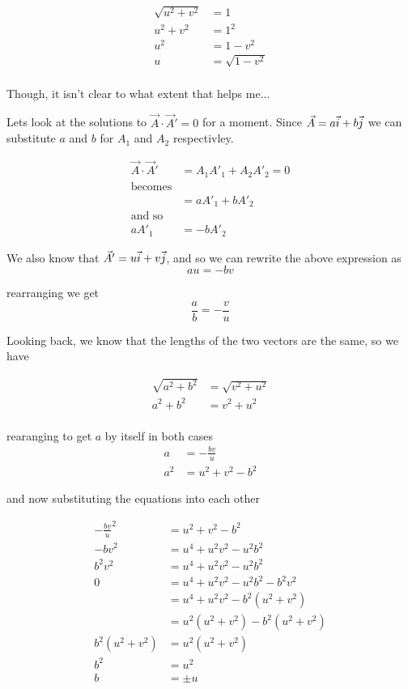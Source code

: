 \documentclass[main.tex]{subfiles}
\begin{document}
\begin{align*}
\sqrt{u^2 + v^2} &= 1\\
u^2 + v^2 &= 1^2\\
u^2 &= 1 - v^2\\
u &= \sqrt{1 - v^2}\\
\end{align*}

Though, it isn't clear to what extent that helps me...

Lets look at the solutions to $\vec{A} \cdot \vec{A}' = 0$ for a
moment. Since $\vec{A} = a\vec{i} + b\vec{j}$ we can substitute $a$ and $b$
for $A_1$ and $A_2$ respectivley.

\begin{align*}
\vec{A} \cdot \vec{A}' &= {A_1}{A'}_1 + {A_2}{A'}_2 = 0\\
\text{becomes}\\
&= a{A'}_1 + b{A'}_2\\
\text{and so}\\
a{A'}_1 &= - b{A'}_2
\end{align*}

We also know that $\vec{A}' = u\vec{i} + v\vec{j}$, and so we can rewrite
the above expression as
\begin{equation*}
au = - bv
\end{equation*}

rearranging we get
\begin{equation*}
\frac{a}{b} = - \frac{v}{u}
\end{equation*}

Looking back, we know that the lengths of the two vectors are the
same, so we have

\begin{align*}
\sqrt{a^2 + b^2} &= \sqrt{v^2 + u^2}\\
a^2 + b^2 &= v^2 + u^2\\
\end{align*}


rearanging to get $a$ by itself in both cases
\begin{align*}
a &= -\frac{bv}{u}\\
a^2 &= u^2 + v^2 - b^2
\end{align*}

and now substituting the equations into each other

\begin{align*}
{-\frac{bv}{u}}^2 &= u^2 + v^2 -b^2\\
-{bv}^2 &= u^4 + u^2v^2 -u^2b^2\\
b^2v^2 &= u^4 + u^2v^2 -u^2b^2\\
0 &= u^4 + u^2v^2 -u^2b^2 - b^2v^2\\
&= u^4 + u^2v^2 - b^2(u^2 + v^2)\\
&= u^2(u^2 + v^2) - b^2(u^2 + v^2)\\
b^2(u^2 + v^2) &= u^2(u^2 + v^2) \\
b^2 &= u^2 \\
b &= \pm u
\end{align*}
\end{document}
